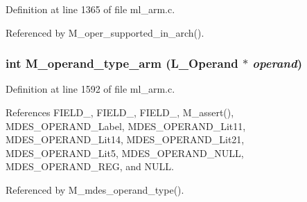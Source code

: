 Definition at line 1365 of file ml\_\-arm.c.

Referenced by M\_\-oper\_\-supported\_\-in\_\-arch().
\subsubsection{\setlength{\rightskip}{0pt plus 5cm}int M\_\-operand\_\-type\_\-arm (L\_\-Operand $\ast$ {\em operand})}\label{ml__arm_8c_4ec85c5a7f35c3b9a3cf6075702bd71a}




Definition at line 1592 of file ml\_\-arm.c.

References FIELD\_, FIELD\_, FIELD\_, M\_\-assert(), MDES\_\-OPERAND\_\-Label, MDES\_\-OPERAND\_\-Lit11, MDES\_\-OPERAND\_\-Lit14, MDES\_\-OPERAND\_\-Lit21, MDES\_\-OPERAND\_\-Lit5, MDES\_\-OPERAND\_\-NULL, MDES\_\-OPERAND\_\-REG, and NULL.

Referenced by M\_\-mdes\_\-operand\_\-type().